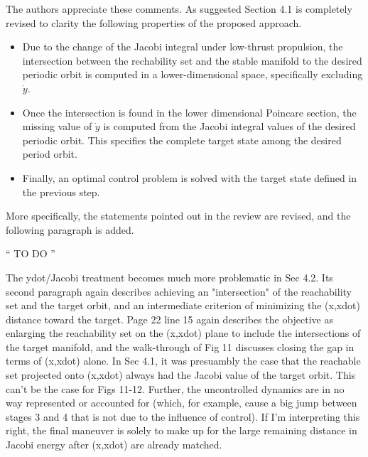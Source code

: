 \documentclass[11pt]{article}
\newenvironment{correction}{\begin{list}{}{\setlength{\leftmargin}{1cm}\setlength{\rightmargin}{1cm}}\vspace{\parsep}\item[]``}{''\end{list}}
\begin{document}
\begin{itemize}
        The authors appreciate these comments. 
        As suggested Section 4.1 is completely revised to clarity the following properties of the proposed approach.
        \begin{itemize}
            \item Due to the change of the Jacobi integral under low-thrust propulsion, the intersection between the rechability set and the stable manifold to the desired periodic orbit is computed in a lower-dimensional space, specifically excluding $\dot y$. 
            \item Once the intersection is found in the lower dimensional Poincare section, the missing value of $\dot y$ is computed from the Jacobi integral values of the desired periodic orbit. 
                This specifies the complete target state among the desired period orbit.
            \item Finally, an optimal control problem is solved with the target state defined in the previous step.
        \end{itemize}
        More specifically, the statements pointed out in the review are revised, and the following paragraph is added. 
        \begin{correction}
            TO DO
        \end{correction}

    \item
        \begin{itshape}
            The ydot/Jacobi treatment becomes much more problematic in Sec 4.2.  Its
            second paragraph again describes achieving an "intersection" of the
            reachability set and the target orbit, and an intermediate criterion of
            minimizing the (x,xdot) distance toward the target. Page 22 line 15 again
            describes the objective as enlarging the reachability set on the (x,xdot)
            plane to include the intersections of the target manifold, and the
            walk-through of Fig 11 discusses closing the gap in terms of (x,xdot)
            alone.  In Sec 4.1, it was presuambly the case that the reachable set
            projected onto (x,xdot) always had the Jacobi value of the target orbit.
            This can't be the case for Figs 11-12.  Further, the uncontrolled dynamics
            are in no way represented or accounted for (which, for example, cause a big
            jump between stages 3 and 4 that is not due to the influence of control).
            If I'm interpreting this right, the final maneuver is solely to make up for
            the large remaining distance in Jacobi energy after (x,xdot) are already
            matched.


\end{itshape}
\end{itemize}
\end{document}
